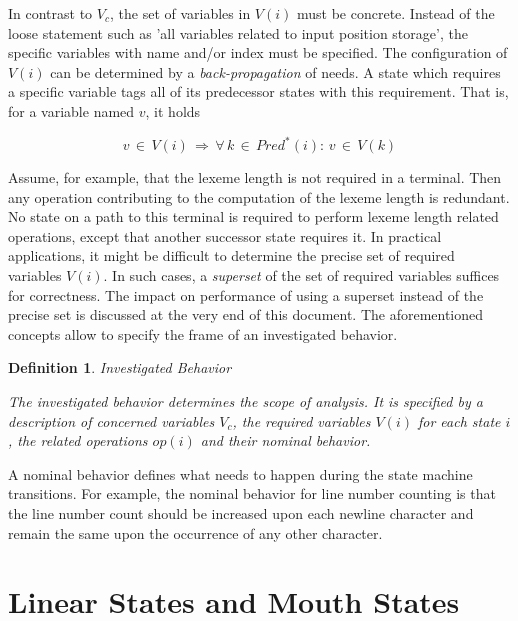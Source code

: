 \documentclass[12pt,a4paper]{scrartcl}
\newtheorem{definition}{Definition}
\begin{document}
In contrast to $V_c$, the set of variables in $V(i)$ must be concrete.  Instead
of the loose statement such as 'all variables related to input position
storage', the specific variables with name and/or index must be specified.  The
configuration of $V(i)$ can be determined by a \textit{back-propagation} of
needs. A state which requires a specific variable tags all of its predecessor
states with this requirement. That is, for a variable named $v$, it holds

\begin{equation}
    v\,\in\,V(i)\,\Rightarrow\,\forall\,k\,\in\,Pred^*(i):\,v\,\in\,V(k)
\end{equation}

Assume, for example, that the lexeme length is not required in a terminal. Then
any operation contributing to the computation of the lexeme length is
redundant.  No state on a path to this terminal is required to perform lexeme
length related operations, except that another successor state requires it.  In
practical applications, it might be difficult to determine the precise set of
required variables $V(i)$. In such cases, a \textit{superset} of the set of
required variables suffices for correctness. The impact on performance of using
a superset instead of the precise set is discussed at the very end of this
document.  The aforementioned concepts allow to specify the frame of an
investigated behavior.  

\begin{definition} Investigated Behavior 

The investigated behavior determines the scope of analysis. It is
specified by a description of concerned variables $V_c$, the required
variables $V(i)$ for each state $i$, the related operations $op(i)$ and
their nominal behavior.
\end{definition}
    
A nominal behavior defines what needs to happen during the state machine
transitions.  For example, the nominal behavior for line number counting is
that the line number count should be increased upon each newline character
and remain the same upon the occurrence of any other character. 

%
\section{Linear States and Mouth States}
\end{document}
